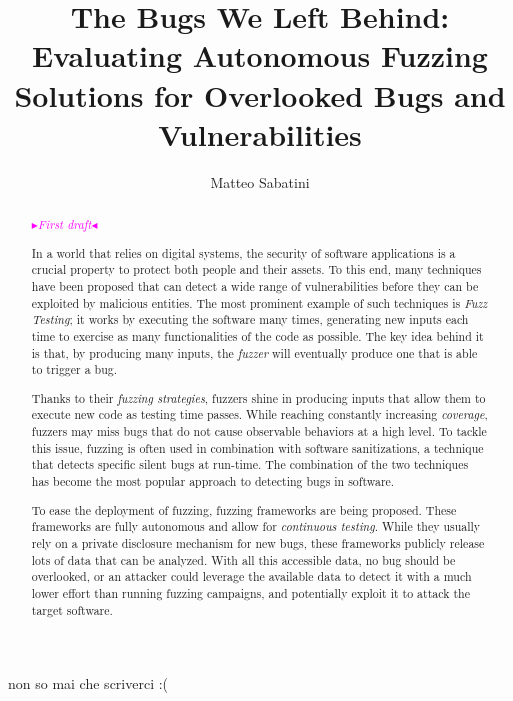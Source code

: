 \documentclass[binding=0.6cm, oneside]{sapthesis}%
\title{The Bugs We Left Behind: Evaluating Autonomous Fuzzing Solutions for Overlooked Bugs and Vulnerabilities}
\author{Matteo Sabatini}
\newcommand{\mytext}[2]{\textcolor{#1}{#2}}
\newcommand{\mynote}[2]{\xspace\fbox{\bfseries\sffamily\scriptsize{#1}}
	{\small$\blacktriangleright$\textsf{\scriptsize\emph{#2}}$\blacktriangleleft$}}
\newcommand{\matteo}[1]{\mytext{magenta}{\mynote{MM}{#1}}}
\begin{document}
\frontmatter
\maketitle

\begin{acknowledgments}
non so mai che scriverci :(
\end{acknowledgments}


\begin{abstract}

	\matteo{First draft}

	In a world that relies on digital systems, the security of software applications is a crucial property to protect both people and their assets. To this end, many techniques have been proposed that can detect a wide range of vulnerabilities before they can be exploited by malicious entities. The most prominent example of such techniques is \textit{Fuzz Testing}; it works by executing the software many times, generating new inputs each time to exercise as many functionalities of the code as possible. The key idea behind it is that, by producing many inputs, the \textit{fuzzer} will eventually produce one that is able to trigger a bug.

	Thanks to their \textit{fuzzing strategies}, fuzzers shine in producing inputs that allow them to execute new code as testing time passes. While reaching constantly increasing \textit{coverage}, fuzzers may miss bugs that do not cause observable behaviors at a high level. To tackle this issue, fuzzing is often used in combination with software sanitizations, a technique that detects specific silent bugs at run-time. The combination of the two techniques has become the most popular approach to detecting bugs in software.
   
	To ease the deployment of fuzzing, fuzzing frameworks are being proposed. These frameworks are fully autonomous and allow for \textit{continuous testing}. While they usually rely on a private disclosure mechanism for new bugs, these frameworks publicly release lots of data that can be analyzed. With all this accessible data, no bug should be overlooked, or an attacker could leverage the available data to detect it with a much lower effort than running fuzzing campaigns, and potentially exploit it to attack the target software.
	   

\end{abstract}
\end{document}
